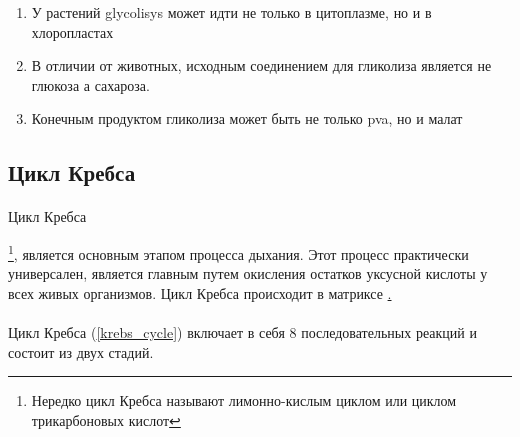 \begin{enumerate}

\item У растений \gls{glycolisys} может идти не только в цитоплазме, но и в хлоропластах
\item В отличии от животных, исходным соединением для гликолиза является не глюкоза а сахароза.
\item Конечным продуктом гликолиза может быть не только \gls{pva}, но и малат

\end{enumerate}

\subsection*{Цикл Кребса}  

\paragraph*{}\hypertarget{krebs_cycle}{Цикл Кребса}\footnote{Нередко цикл Кребса называют лимонно-кислым циклом или циклом трикарбоновых кислот}, является основным этапом процесса дыхания. Этот процесс практически универсален, является главным путем окисления остатков уксусной кислоты у всех живых организмов. Цикл Кребса происходит в матриксе \hyperlink{митохондрий}.     
  


\paragraph*{}Цикл Кребса (\ris \ref{krebs_cycle}) включает в себя 8 последовательных реакций и состоит из двух стадий.

